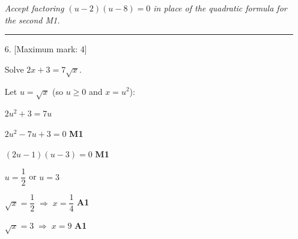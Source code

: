 \documentclass[12pt, twoside]{article}
\begin{document}
\begin{enumerate}[itemsep=0.3cm]
\emph{Accept factoring $(u - 2)(u - 8) = 0$ in place of the quadratic formula for the second M1.}

\bigskip
\hrule
\bigskip

\item[6.] [Maximum mark: 4]

Solve $2x + 3 = 7\sqrt{x}$.

\medskip

Let $u = \sqrt{x}$ (so $u \ge 0$ and $x = u^2$):

$2u^2 + 3 = 7u$

$2u^2 - 7u + 3 = 0$ \hfill \textbf{M1}

$(2u - 1)(u - 3) = 0$ \hfill \textbf{M1}

$u = \dfrac{1}{2}$ or $u = 3$

$\sqrt{x} = \dfrac{1}{2} \;\Rightarrow\; x = \dfrac{1}{4}$ \hfill \textbf{A1}

$\sqrt{x} = 3 \;\Rightarrow\; x = 9$ \hfill \textbf{A1}

\end{enumerate}
\end{document}
